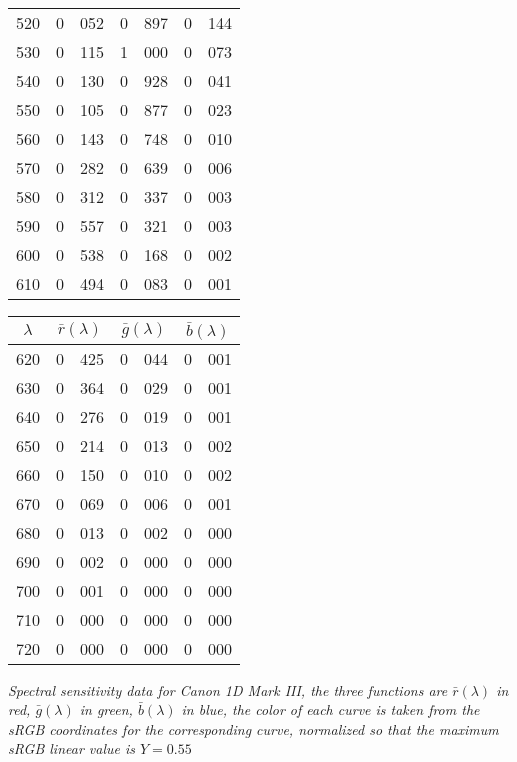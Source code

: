 {{\begin{minipage}{.3\textwidth}
\begin{tabular}{c|r@{.}l | r@{.}l | r@{.}l}
 520 &   0&052 &   0&897 &   0&144 \\
 530 &   0&115 &   1&000 &   0&073 \\
 540 &   0&130 &   0&928 &   0&041 \\
 550 &   0&105 &   0&877 &   0&023 \\
 560 &   0&143 &   0&748 &   0&010 \\
 570 &   0&282 &   0&639 &   0&006 \\
 580 &   0&312 &   0&337 &   0&003 \\
 590 &   0&557 &   0&321 &   0&003 \\
 600 &   0&538 &   0&168 &   0&002 \\
 610 &   0&494 &   0&083 &   0&001 \\
\end{tabular}
\end{minipage}\hfill
\begin{minipage}{.3\textwidth}
\centering
\begin{tabular}{c|r@{.}l | r@{.}l | r@{.}l}
$\lambda$ & \multicolumn{2}{c|}{$\bar r(\lambda)$} &  \multicolumn{2}{c|}{$\bar g(\lambda)$} &  \multicolumn{2}{c}{$\bar b(\lambda)$} \\
\hline
 620 &   0&425 &   0&044 &   0&001 \\
 630 &   0&364 &   0&029 &   0&001 \\
 640 &   0&276 &   0&019 &   0&001 \\
 650 &   0&214 &   0&013 &   0&002 \\
 660 &   0&150 &   0&010 &   0&002 \\
 670 &   0&069 &   0&006 &   0&001 \\
 680 &   0&013 &   0&002 &   0&000 \\
 690 &   0&002 &   0&000 &   0&000 \\
 700 &   0&001 &   0&000 &   0&000 \\
 710 &   0&000 &   0&000 &   0&000 \\
 720 &   0&000 &   0&000 &   0&000 \\
\end{tabular}
\end{minipage}

\vskip 1mm
}
\centering
{\footnotesize\it Spectral sensitivity data for Canon 1D Mark III, the three
functions
are $\bar r(\lambda)$ in red, $\bar g(\lambda)$ in green, $\bar b(\lambda)$ in blue,
the color of each curve is taken from the \gls{sRGB} coordinates for the
corresponding
curve, normalized so that the maximum \gls{sRGB} linear value is $Y = 0.55$
}
\label{tab:canon1dmiii}
}

